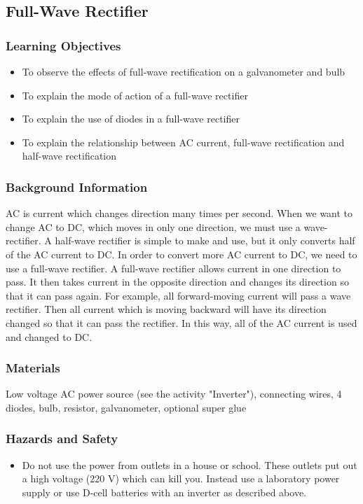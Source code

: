 \subsection{Full-Wave Rectifier}

\subsubsection*{Learning Objectives}
\begin{itemize}
\item{To observe the effects of full-wave rectification on a galvanometer and bulb}
\item{To explain the mode of action of a full-wave rectifier}
\item{To explain the use of diodes in a full-wave rectifier}
\item{To explain the relationship between AC current, full-wave rectification and half-wave rectification}
\end{itemize}

\subsubsection*{Background Information}
AC is current which changes direction many times per second.  When we want to change AC to DC, which moves in only one direction, we must use a wave-rectifier.  A half-wave rectifier is simple to make and use, but it only converts half of the AC current to DC.  In order to convert more AC current to DC, we need to use a full-wave rectifier.
A full-wave rectifier allows current in one direction to pass.  It then takes current in the opposite direction and changes its direction so that it can pass again.  For example, all forward-moving current will pass a wave rectifier.  Then all current which is moving backward will have its direction changed so that it can pass the rectifier.  In this way, all of the AC current is used and changed to DC.

\subsubsection*{Materials}
Low voltage AC power source (see the activity "Inverter"), connecting wires, 4 diodes, bulb, resistor, galvanometer, optional super glue

\subsubsection*{Hazards and Safety}
\begin{itemize}
\item{Do not use the power from outlets in a house or school.  These outlets put out a high voltage (220 V) which can kill you.  Instead use a laboratory power supply or use D-cell batteries with an inverter as described above.}
\end{itemize}

